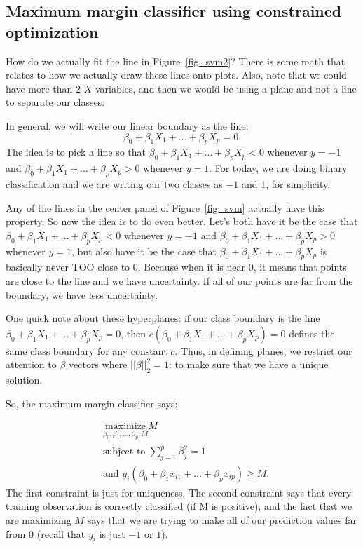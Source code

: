 \subsection{Maximum margin classifier using constrained optimization}

How do we actually fit the line in Figure~\ref{fig_svm2}? There is some math that relates to how we actually draw these lines onto plots. Also, note that we could have more than $2$ $X$ variables, and then we would be using a plane and not a line to separate our classes. 

In general, we will write our linear boundary as the line:
$$
\beta_0 + \beta_1 X_1 + \ldots + \beta_p X_p = 0. 
$$
The idea is to pick a line so that $\beta_0 + \beta_1 X_1 + \ldots + \beta_p X_p < 0$ whenever $y=-1$ and $\beta_0 + \beta_1 X_1 + \ldots + \beta_p X_p > 0$ whenever $y=1$. For today, we are doing binary classification and we are writing our two classes as $-1$ and $1$, for simplicity. 

Any of the lines in the center panel of Figure~\ref{fig_svm} actually have this property. So now the idea is to do even better. Let's both have it be the case that $\beta_0 + \beta_1 X_1 + \ldots + \beta_p X_p < 0$ whenever $y=-1$ and $\beta_0 + \beta_1 X_1 + \ldots + \beta_p X_p > 0$ whenever $y=1$, but also have it be the case that $\beta_0 + \beta_1 X_1 + \ldots + \beta_p X_p$ is basically never TOO close to $0$. Because when it is near $0$, it means that points are close to the line and we have uncertainty. If all of our points are far from the boundary, we have less uncertainty.

One quick note about these hyperplanes: if our class boundary is the line $\beta_0 + \beta_1 X_1 + \ldots + \beta_p X_p = 0$, then $c(\beta_0 + \beta_1 X_1 + \ldots + \beta_p X_p) = 0$ defines the same class boundary for any constant $c$. Thus, in defining planes, we restrict our attention to $\beta$ vectors where $||\beta||_2^2=1$: to make sure that we have a unique solution. 

So, the maximum margin classifier says:

\begin{align*}
&\underset{{\beta_0, \beta_1, \ldots, \beta_p, M}}{\mathrm{maximize}} M \\
&\text{subject to } \sum_{j=1}^p \beta_j^2 = 1 \\
&\text{and } y_i (\beta_0 + \beta_1 x_{i1} + \ldots + \beta_p x_{ip} ) \geq M. 
\end{align*}
The first constraint is just for uniqueness. The second constraint says that every training observation is correctly classified (if M is positive), and the fact that we are maximizing $M$ says that we are trying to make all of our prediction values far from $0$ (recall that $y_i$ is just $-1$ or $1$). 

